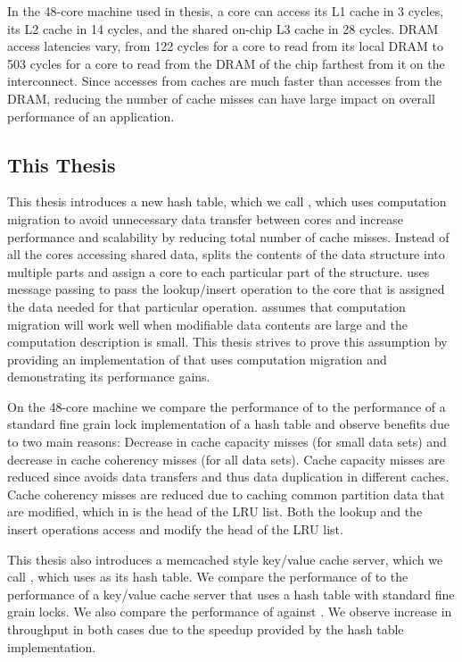 In the 48-core machine used in thesis, a core can access its L1 cache in 3 cycles, its L2 cache in 14 cycles, and the shared on-chip 
L3 cache in 28 cycles. DRAM access latencies vary, from 122 cycles for a core to read from its local DRAM to 503 cycles for a 
core to read from the DRAM of the chip farthest from it on the interconnect. Since accesses from caches are much faster than 
accesses from the DRAM, reducing the number of cache misses can have large impact on overall performance of an application.


\subsection{This Thesis}

This thesis introduces a new hash table, which we call \cphash{}, which uses computation migration to avoid unnecessary data transfer between cores 
and increase performance and scalability by reducing total number of cache misses. Instead of all the cores accessing shared data, \cphash{} splits the 
contents of the data structure into multiple parts and assign a core to each particular part of the structure. \cphash{} uses message passing 
to pass the lookup/insert operation to the core that is assigned the data needed for that particular operation. \cphash{} assumes that computation migration will 
work well when modifiable data contents are large and the computation description is small. This thesis strives to prove this 
assumption by providing an implementation of \cphash{} that uses computation migration and demonstrating its performance gains. 

On the 48-core machine we compare the performance of \cphash{} to the performance of a standard fine grain lock implementation of a hash table and 
observe benefits due to two main reasons: Decrease in cache capacity misses (for small data sets) and decrease in cache coherency misses (for all data sets).
Cache capacity misses are reduced since \cphash{} avoids data transfers and thus data duplication in different caches. Cache coherency misses
are reduced due to caching common partition data that are modified, which in \cphash{} is the head of the LRU list. Both the lookup and the insert 
operations access and modify the head of the LRU list.

This thesis also introduces a memcached style key/value cache server, which we call \cpserver{}, which uses \cphash{} as its hash table. We compare the performance of \cpserver{} to the
performance of a key/value cache server that uses a hash table with standard fine grain locks. We also compare the performance of \cpserver{} against \memcached{}.
We observe increase in throughput in both cases due to the speedup provided by the \cphash{} hash table implementation. 

